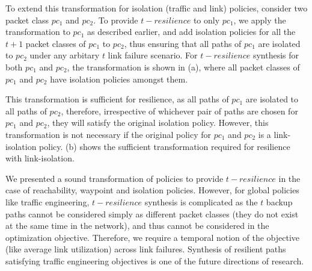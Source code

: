 To extend this transformation for isolation (traffic and link) policies, consider two packet class $pc_1$ 
and $pc_2$. 
To provide $t-resilience$ to only $pc_1$, we apply the transformation to $pc_1$ as described
earlier, and add isolation policies for all the $t+1$ packet classes of $pc_1$ to $pc_2$,
thus ensuring that all paths of $pc_1$ are isolated to $pc_2$ under any arbitary $t$ link 
failure scenario. For $t-resilience$ synthesis for both $pc_1$ and $pc_2$, the transformation
is shown in (a), where all packet classes of $pc_1$ and $pc_2$ have 
isolation policies amongst them. 

This transformation is sufficient for resilience, as all paths of $pc_1$ are isolated to all paths of $pc_2$,
therefore, irrespective of whichever pair of paths are chosen for $pc_1$ and $pc_2$,
they will satisfy the original isolation policy. 
 However, this transformation is not necessary if the original policy for 
 $pc_1$ and $pc_2$ is a link-isolation policy. (b) shows
 the sufficient transformation required for resilience with link-isolation.

We presented a sound transformation of policies to provide $t-resilience$ in
the case of reachability, waypoint and isolation policies. However, for global policies like 
traffic engineering, $t-resilience$ synthesis is complicated as the $t$ backup paths 
cannot be considered simply as different packet classes (they do not exist at the same time
in the network),
and thus cannot be considered in the optimization objective. Therefore, we require a 
temporal notion of the objective (like average link utilization) across link failures.
 Synthesis of resilient paths
satisfying traffic engineering objectives is one of the future directions of research.